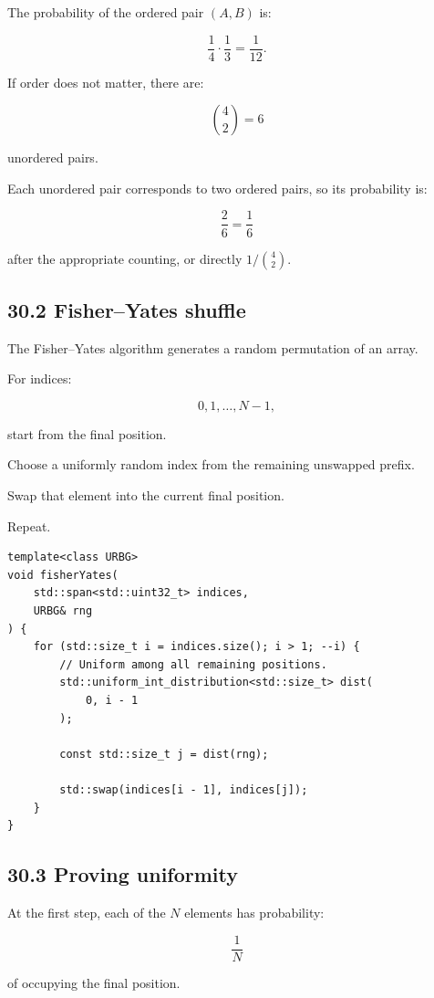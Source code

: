 The probability of the ordered pair \((A,B)\) is:

\[ \frac14\cdot\frac13=\frac1{12}. \]

If order does not matter, there are:

\[ \binom42=6 \]

unordered pairs.

Each unordered pair corresponds to two ordered pairs, so its probability is:

\[ \frac26=\frac16 \]

after the appropriate counting, or directly \(1/\binom42\).

\subsection{30.2 Fisher--Yates shuffle}\label{02-foundations-ii-ch031-fisheryates-shuffle}

The Fisher--Yates algorithm generates a random permutation of an array.

For indices:

\[ 0,1,\ldots,N-1, \]

start from the final position.

Choose a uniformly random index from the remaining unswapped prefix.

Swap that element into the current final position.

Repeat.

\begin{verbatim}
template<class URBG>
void fisherYates(
    std::span<std::uint32_t> indices,
    URBG& rng
) {
    for (std::size_t i = indices.size(); i > 1; --i) {
        // Uniform among all remaining positions.
        std::uniform_int_distribution<std::size_t> dist(
            0, i - 1
        );

        const std::size_t j = dist(rng);

        std::swap(indices[i - 1], indices[j]);
    }
}
\end{verbatim}

\subsection{30.3 Proving uniformity}\label{02-foundations-ii-ch031-proving-uniformity}

At the first step, each of the \(N\) elements has probability:

\[ \frac1N \]

of occupying the final position.

